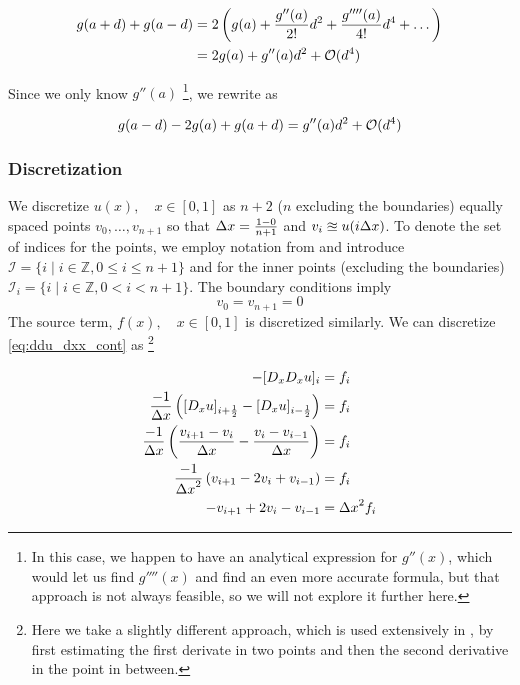 \documentclass[a4paper]{article}
\begin{document}
\begin{align}
    g(a+d) + g(a-d)
        &= 2\left( g(a) + \frac{g''(a)}{2!} d^2 + \frac{g''''(a)}{4!} d^4 + \dots \right) \\
        &= 2g(a) + g''(a) d^2 + {\mathcal{O}}(d^4)
\end{align}

Since we only know $g''(a)$ \footnote{In this case, we happen to have an analytical expression for $g''(x)$, which would let us find $g''''(x)$ and find an even more accurate formula, but that approach is not always feasible, so we will not explore it further here.}, we rewrite as

\begin{equation}
     g(a-d) - 2g(a) + g(a+d) = g''(a)d^2 + {\mathcal{O}}(d^4)
\end{equation}

\subsubsection{Discretization}
We discretize $u(x), \quad x \in [0, 1]$ as $n+2$ ($n$ excluding the boundaries) equally spaced points $v_0, \dots, v_{n+1}$ so that ${\Delta x} = \frac{1 - 0}{n+1}$ and $v_i \approxeq u(i {\Delta x})$. To denote the set of indices for the points, we employ notation from \cite{hpl_fdm} and introduce $\mathcal{I} = \{ i \mid i \in \mathbb{Z}, 0 \leq i \leq n + 1\}$ and for the inner points (excluding the boundaries) $\mathcal{I}_i = \{ i \mid i \in \mathbb{Z}, 0 < i < n + 1\}$.
The boundary conditions imply
\begin{equation}
v_0 = v_{n+1} = 0
\label{eq:boundaries_disc}
\end{equation}
The source term, $f(x), \quad x \in [0, 1]$ is discretized similarly. We can discretize \eqref{eq:ddu_dxx_cont} as
\footnote{Here we take a slightly different approach, which is used extensively in \cite{hpl_fdm}, by first estimating the first derivate in two points and then the second derivative in the point in between.}

\begin{align*}
-[D_x D_x u]_i &= f_i \\
\frac{-1}{{\Delta x}} \left( [D_x u]_{i+\frac{1}{2}} - [D_x u]_{i-\frac{1}{2}} \right) &= f_i \\
\frac{-1}{{\Delta x}} \left( \frac{v_{i+1} - v_{i}}{{\Delta x}} - \frac{v_{i} - v_{i-1}}{{\Delta x}} \right) &= f_i \\
\frac{-1}{{\Delta x}^2} \left( v_{i+1} - 2v_{i} + v_{i-1} \right) &= f_i \\
-v_{i+1} + 2v_{i} - v_{i-1}  &= {\Delta x}^2 f_i
\end{align*}
\end{document}
